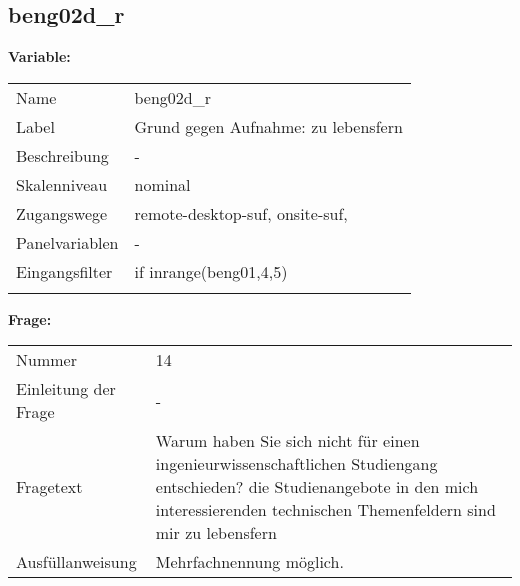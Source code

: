 	
	
	\subsection{beng02d\_r}
	\label{subSection:beng02d_r}

	\noindent\textbf{Variable:}\\
		\begin{tabular}{lL{11.3cm}}
			\label{tableVariable:beng02d_r}
			Name & beng02d\_r \\
			Label & Grund gegen Aufnahme: zu lebensfern \\
			Beschreibung & - \\
			Skalenniveau & nominal \\
			Zugangswege &
				remote-desktop-suf,
				onsite-suf,
 \\
			Panelvariablen & -
			 \\
			Eingangsfilter & if inrange(beng01,4,5) \\
 \\
		\end{tabular}

		\vspace*{1 cm}
		\noindent\textbf{Frage:}\\
		\begin{tabular}{lL{11.3cm}}
			\label{tableQuestion:beng02d_r}
			Nummer & 14 \\
			Einleitung der Frage & - \\
			Fragetext & Warum haben Sie sich nicht für einen ingenieurwissenschaftlichen Studiengang entschieden?
die Studienangebote in den mich interessierenden technischen Themenfeldern sind mir zu lebensfern \\
			Ausfüllanweisung & Mehrfachnennung möglich. \\
		\end{tabular}





